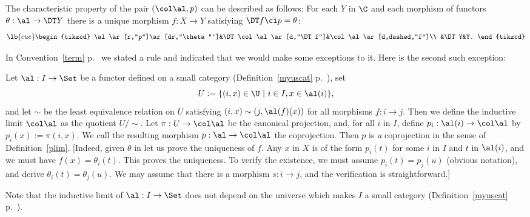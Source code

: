 \documentclass[12pt]{article}
\theoremstyle{remark}
\theoremstyle{definition}
\begin{document}
The characteristic property of the pair $(\col\al,p)$ can be described as follows: For each $Y$ in $\C$ and each morphism of functors $\theta:\al\to\DT Y$ there is a unique morphism $f:X\to Y$ satisfying $\DT f\ci p=\theta$: 
\begin{equation}\lb{cue}
\begin{tikzcd}
\al\ar[r,"p"]\ar[dr,"\theta"']&\DT\col\al\ar[d,"\DT f"]&\col\al\ar[d,dashed,"f"]\\ 
&\DT Y&Y.
\end{tikzcd}
\end{equation}

In Convention~\ref{term} p.~ we stated a rule and indicated that we would make some exceptions to it. Here is the second such exception:

\begin{conv}
Let $\al:I\to\Set$ be a functor defined on a small category (Definition~\ref{myuscat} p.~), set 
$$ 
U:=\{(i,x)\in\U\ |\ i\in I,x\in\al(i)\},
$$ 
and let $\sim$ be the least equivalence relation on $U$ satisfying $(i,x)\sim(j,\al(f)(x))$ for all morphisms $f:i\to j$. Then we define the inductive limit $\col\al$ as the quotient $U/\!\!\sim$. Let $\pi:U\to\col\al$ be the canonical projection, and, for all $i$ in $I$, define $p_i:\al(i)\to\col\al$ by $p_i(x):=\pi(i,x)$. We call the resulting morphism $p:\al\to\col\al$ the coprojection. Then $p$ is \emph{a} coprojection in the sense of Definition~\ref{plim}. [Indeed, given $\theta$ in  let us prove the uniqueness of $f$. Any $x$ in $X$ is of the form $p_i(t)$ for some $i$ in $I$ and $t$ in $\al(i)$, and we must have $f(x)=\theta_i(t)$. This proves the uniqueness. To verify the existence, we must assume $p_i(t)=p_j(u)$ (obvious notation), and derive $\theta_i(t)=\theta_j(u)$. We may assume that there is a morphism $s:i\to j$, and the verification is straightforward.]
\end{conv} 

Note that the inductive limit of $\al:I\to\Set$ does not depend on the universe which makes $I$ a small category (Definition~\ref{myuscat} p.~).



\end{document}
